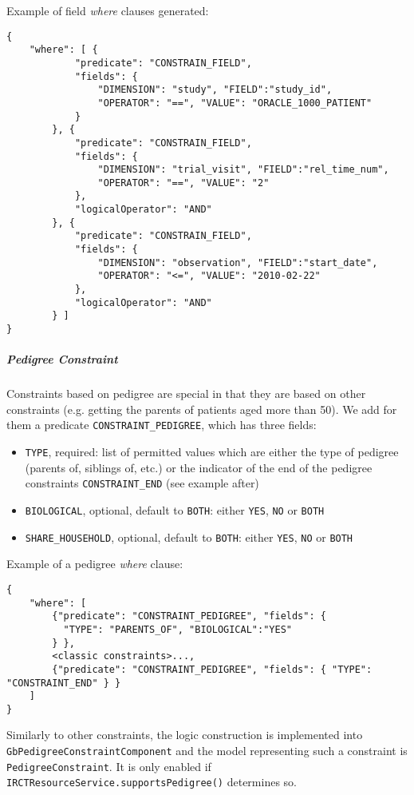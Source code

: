 Example of field \emph{where} clauses generated:
\begin{verbatim}
{
    "where": [ {
            "predicate": "CONSTRAIN_FIELD", 
            "fields": { 
                "DIMENSION": "study", "FIELD":"study_id", 
                "OPERATOR": "==", "VALUE": "ORACLE_1000_PATIENT" 
            } 
        }, {
            "predicate": "CONSTRAIN_FIELD", 
            "fields": { 
                "DIMENSION": "trial_visit", "FIELD":"rel_time_num", 
                "OPERATOR": "==", "VALUE": "2" 
            },
            "logicalOperator": "AND"
        }, {
            "predicate": "CONSTRAIN_FIELD", 
            "fields": { 
                "DIMENSION": "observation", "FIELD":"start_date", 
                "OPERATOR": "<=", "VALUE": "2010-02-22" 
            },
            "logicalOperator": "AND"
        } ]
}
\end{verbatim}

\subparagraph{Pedigree Constraint}
Constraints based on pedigree are special in that they are based on other constraints (e.g. getting the parents of patients aged more than 50).
We add for them a predicate \verb|CONSTRAINT_PEDIGREE|, which has three fields:
\begin{itemize}
    \item \verb|TYPE|, required: list of permitted values which are either the type of pedigree (parents of, siblings of, etc.) or the indicator of the end of the pedigree constraints \verb|CONSTRAINT_END| (see example after)
    \item \verb|BIOLOGICAL|, optional, default to \verb|BOTH|: either \verb|YES|, \verb|NO| or \verb|BOTH|
    \item \verb|SHARE_HOUSEHOLD|, optional, default to \verb|BOTH|: either \verb|YES|, \verb|NO| or \verb|BOTH|
\end{itemize}

Example of a pedigree \emph{where} clause:
\begin{verbatim}
{
    "where": [
        {"predicate": "CONSTRAINT_PEDIGREE", "fields": { 
          "TYPE": "PARENTS_OF", "BIOLOGICAL":"YES" 
        } },
        <classic constraints>..., 
        {"predicate": "CONSTRAINT_PEDIGREE", "fields": { "TYPE": "CONSTRAINT_END" } }
    ]
}
\end{verbatim}

Similarly to other constraints, the logic construction is implemented into \\
\verb|GbPedigreeConstraintComponent| and the model representing such a constraint is \verb|PedigreeConstraint|.
It is only enabled if \verb|IRCTResourceService.supportsPedigree()| determines so.

